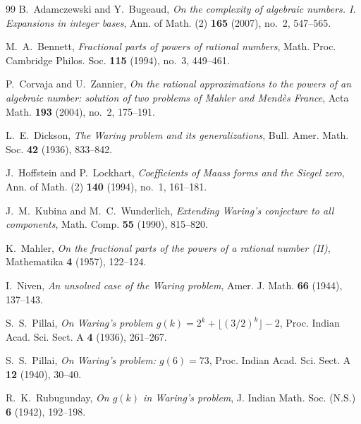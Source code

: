 \documentclass[11pt,reqno]{amsart}
\theoremstyle{definition}
\numberwithin{equation}{section}
\begin{document}
\begin{thebibliography}{99}
\small
{}
B.~Adamczewski and Y.~Bugeaud, \emph{On the complexity of algebraic numbers. I. Expansions in integer bases}, Ann. of Math. (2) \textbf{165} (2007), no.~2, 547--565.

M.~A.~Bennett, \emph{Fractional parts of powers of rational numbers}, Math. Proc. Cambridge Philos. Soc. \textbf{115} (1994), no.~3, 449--461.

P.~Corvaja and U.~Zannier, \emph{On the rational approximations to the powers of an algebraic number: solution of two problems of Mahler and Mendès France}, Acta Math. \textbf{193} (2004), no.~2, 175--191.

L.~E.~Dickson, \emph{The Waring problem and its generalizations}, Bull. Amer. Math. Soc. \textbf{42} (1936), 833--842.

J.~Hoffstein and P.~Lockhart, \emph{Coefficients of Maass forms and the Siegel zero}, Ann. of Math. (2) \textbf{140} (1994), no.~1, 161--181.

J.~M.~Kubina and M.~C.~Wunderlich, \emph{Extending Waring's conjecture to all components}, Math. Comp. \textbf{55} (1990), 815--820.

K.~Mahler, \emph{On the fractional parts of the powers of a rational number (II)}, Mathematika \textbf{4} (1957), 122--124.

I.~Niven, \emph{An unsolved case of the Waring problem}, Amer. J. Math. \textbf{66} (1944), 137--143.

S.~S.~Pillai, \emph{On Waring's problem $g(k) = 2^k + \lfloor(3/2)^k\rfloor - 2$}, Proc. Indian Acad. Sci. Sect. A \textbf{4} (1936), 261--267.

S.~S.~Pillai, \emph{On Waring's problem: $g(6) = 73$}, Proc. Indian Acad. Sci. Sect. A \textbf{12} (1940), 30--40.

R.~K.~Rubugunday, \emph{On $g(k)$ in Waring's problem}, J. Indian Math. Soc. (N.S.) \textbf{6} (1942), 192--198.
\end{thebibliography}
\end{document}
